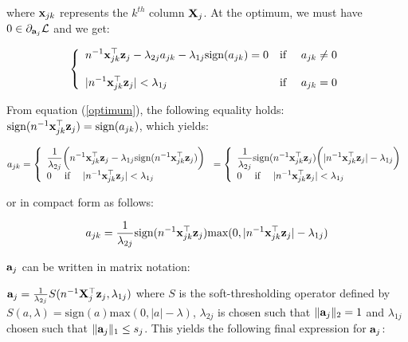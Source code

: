 \documentclass[
]{jss}
\begin{document}
where \(\mathbf{x}_{jk}\) represents the \(k^{th}\) column \(\mathbf{X}_j\). At
the optimum, we must have \(0 \in \partial_{\mathbf{a}_{j}} \mathcal{L}\) and
we get:

\begin{equation}
\left \lbrace
\begin{array}{ll}
\displaystyle n^{-1} \mathbf{x}_{jk}^\top\mathbf{z}_j  -\lambda_{2j}a_{jk} - \lambda_{1j}\text{sign}(a_{jk}) = 0 & \text{if~~~~}a_{jk} \ne 0\\\\
\displaystyle \vert n^{-1} \mathbf{x}_{jk}^\top\mathbf{z}_j  \vert < \lambda_{1j} & \text{if~~~~}a_{jk}=0
\end{array}
\right.
\label{optimum}
\end{equation}

From equation (\ref{optimum}), the following equality holds:
\(\text{sign}(n^{-1} \mathbf{x}_{jk}^\top\mathbf{z}_j ) = \text{sign}(a_{jk})\),
which yields:

\begin{equation}
a_{jk} = 
\left \lbrace
\begin{array}{l}
\displaystyle \frac{1}{\lambda_{2j}} \bigg (n^{-1} \mathbf{x}_{jk}^\top\mathbf{z}_j  - \lambda_{1j}\text{sign}(n^{-1} \mathbf{x}_{jk}^\top\mathbf{z}_j )\bigg)\\
\displaystyle 0 \text{~~~~if~~~~}\vert n^{-1} \mathbf{x}_{jk}^\top\mathbf{z}_j  \vert < \lambda_{1j}
\end{array}
\right.
= \left \lbrace
\begin{array}{ll}
\displaystyle \frac{1}{\lambda_{2j}} \text{sign}(n^{-1} \mathbf{x}_{jk}^\top\mathbf{z}_j)\bigg(\vert n^{-1} \mathbf{x}_{jk}^\top\mathbf{z}_j \vert - \lambda_{1j}\bigg)\\
\displaystyle 0 \text{~~~~if~~~~}\vert n^{-1} \mathbf{x}_{jk}^\top\mathbf{z}_j \vert < \lambda_{1j}
\end{array}
\right.
\label{optimum1}
\end{equation}

or in compact form as follows:

\begin{equation}
a_{jk} = \frac{1}{\lambda_{2j}} \text{sign}(n^{-1} \mathbf{x}_{jk}^\top\mathbf{z}_j )\text{max}(0, \vert n^{-1} \mathbf{x}_{jk}^\top\mathbf{z}_j \vert - \lambda_{1j}) 
\label{optimum2}
\end{equation}

\(\mathbf{a}_j\) can be written in matrix notation:

\(\mathbf{a}_j = \frac{1}{\lambda_{2j}} S(n^{-1} \mathbf{X}_j^\top\mathbf{z}_j, \lambda_{1j})\)
where \(S\) is the soft-thresholding operator defined by
\(S(a, \lambda) = \text{sign}(a)\text{max}(0, \vert a \vert-\lambda)\),
\(\lambda_{2j}\) is chosen such that \(\Vert \mathbf{a}_j \Vert_2 = 1\) and
\(\lambda_{1j}\) chosen such that \(\Vert \mathbf{a}_j \Vert_1 \le s_j\). This
yields the following final expression for \(\mathbf{a}_j\):
\end{document}
